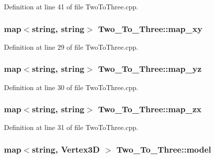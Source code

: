 Definition at line 41 of file Two\+To\+Three.\+cpp.

\subsubsection[{\texorpdfstring{map\+\_\+xy}{map_xy}}]{\setlength{\rightskip}{0pt plus 5cm}map$<$string, string$>$ Two\+\_\+\+To\+\_\+\+Three\+::map\+\_\+xy}\hypertarget{class_two___to___three_a699e1b081ba68063b84ee0628f1824f1}{}\label{class_two___to___three_a699e1b081ba68063b84ee0628f1824f1}


Definition at line 29 of file Two\+To\+Three.\+cpp.

\subsubsection[{\texorpdfstring{map\+\_\+yz}{map_yz}}]{\setlength{\rightskip}{0pt plus 5cm}map$<$string, string$>$ Two\+\_\+\+To\+\_\+\+Three\+::map\+\_\+yz}\hypertarget{class_two___to___three_ab50e85aa8226e964ba2fcbf95fade23d}{}\label{class_two___to___three_ab50e85aa8226e964ba2fcbf95fade23d}


Definition at line 30 of file Two\+To\+Three.\+cpp.

\subsubsection[{\texorpdfstring{map\+\_\+zx}{map_zx}}]{\setlength{\rightskip}{0pt plus 5cm}map$<$string, string$>$ Two\+\_\+\+To\+\_\+\+Three\+::map\+\_\+zx}\hypertarget{class_two___to___three_a6c016590ff5c2c305eaa571e6d8f47ed}{}\label{class_two___to___three_a6c016590ff5c2c305eaa571e6d8f47ed}


Definition at line 31 of file Two\+To\+Three.\+cpp.

\subsubsection[{\texorpdfstring{model}{model}}]{\setlength{\rightskip}{0pt plus 5cm}map$<$string, {\bf Vertex3D} $>$ Two\+\_\+\+To\+\_\+\+Three\+::model}\hypertarget{class_two___to___three_aa57efe556b563e0e5b45fa9f1653c1cd}{}\label{class_two___to___three_aa57efe556b563e0e5b45fa9f1653c1cd}


